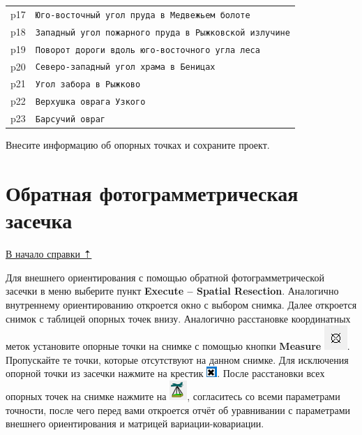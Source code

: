 \documentclass[
  12pt,
]{book}
\begin{document}
\begin{longtable}[]{@{}
  >{\raggedright\arraybackslash}p{}
  >{\raggedright\arraybackslash}p{}@{}}
p17 & \texttt{Юго-восточный\ угол\ пруда\ в\ Медвежьем\ болоте} \\
p18 & \texttt{Западный\ угол\ пожарного\ пруда\ в\ Рыжковской\ излучине} \\
p19 & \texttt{Поворот\ дороги\ вдоль\ юго-восточного\ угла\ леса} \\
p20 & \texttt{Северо-западный\ угол\ храма\ в\ Беницах} \\
p21 & \texttt{Угол\ забора\ в\ Рыжково} \\
p22 & \texttt{Верхушка\ оврага\ Узкого} \\
p23 & \texttt{Барсучий\ овраг} \\
\end{longtable}

Внесите информацию об опорных точках и сохраните проект.

\hypertarget{stereo-resection}{%
\section{Обратная фотограмметрическая засечка}\label{stereo-resection}}

\protect\hyperlink{stereo}{В начало справки ⇡}

Для внешнего ориентирования с помощью обратной фотограмметрической засечки в меню выберите пункт \textbf{Execute -- Spatial Resection}. Аналогично внутреннему ориентированию откроется окно с выбором снимка. Далее откроется снимок с таблицей опорных точек внизу. Аналогично расстановке координатных меток установите опорные точки на снимке с помощью кнопки \textbf{Measure} \includegraphics{images/Ref13/Measure.png}. Пропускайте те точки, которые отсутствуют на данном снимке. Для исключения опорной точки из засечки нажмите на крестик \includegraphics{images/Ref13/Exclusion.png}. После расстановки всех опорных точек на снимке нажмите на \includegraphics{images/Ref03/Execute_EO.png}, согласитесь со всеми параметрами точности, после чего перед вами откроется отчёт об уравнивании с параметрами внешнего ориентирования и матрицей вариации-ковариации.
\end{document}
